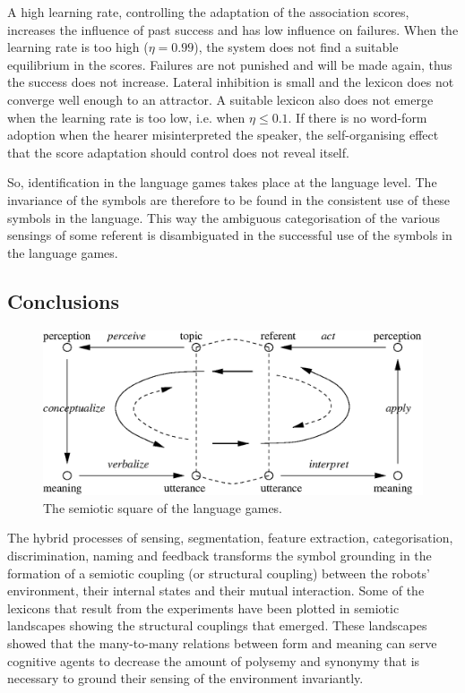 A high learning rate, controlling the adaptation of the association scores, increases the influence of past success and has low influence on failures. When the learning rate is too high ($\eta=0.99$), the system does not find a suitable equilibrium in the scores. Failures are not punished and will be made again, thus the success does not increase. Lateral inhibition is small and the lexicon does not converge well enough to an attractor. A suitable lexicon also does not emerge when the learning rate is too low, i.e. when $\eta \leq 0.1$. If there is no word-form adoption when the hearer misinterpreted the speaker, the self-organising effect that the score adaptation should control does not reveal itself.


So, identification in the language games takes place at the language level. The invariance of the symbols are therefore to be found in the consistent use of these symbols in the language. This way the ambiguous categorisation of the various sensings of some referent is disambiguated in the successful use of the symbols in the language games.

\subsection{Conclusions}

\begin{figure}
\centerline{\includegraphics[width=12cm]{discr_games/semiotic1.eps}}
\caption{The semiotic square of the language games.}
\label{f:disc:semiotic}
\end{figure}

The hybrid processes of sensing, segmentation, feature extraction, categorisation, discrimination, naming and feedback transforms the symbol grounding in the formation of a semiotic coupling (or structural coupling)  between the robots' environment, their internal states and their mutual interaction. Some of the lexicons that result from the experiments have been plotted in semiotic landscapes showing the structural couplings that emerged. These landscapes showed that the many-to-many relations between form and meaning can serve cognitive agents to decrease the amount of polysemy and synonymy that is necessary to ground their sensing of the environment invariantly.

